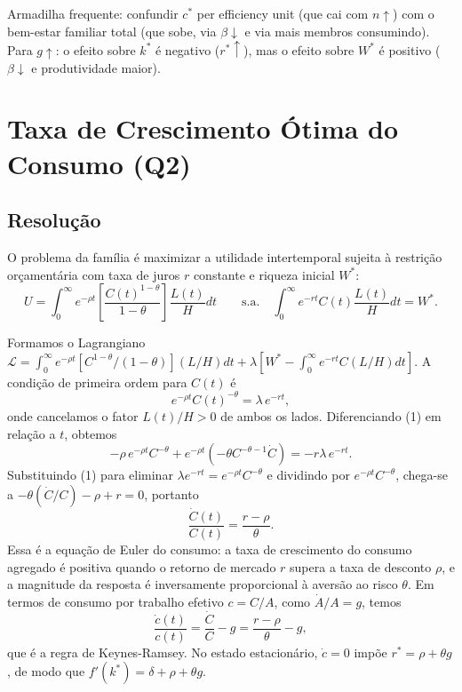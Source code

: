 \documentclass[12pt, a4paper]{article}
\begin{document}
\begin{provabox}[title={Q1 --- Atenção em (c) e (d)}]
Armadilha frequente: confundir $c^*$ per efficiency unit (que cai com $n\uparrow$) com o bem-estar familiar total (que sobe, via $\beta\downarrow$ e via mais membros consumindo). Para $g\uparrow$: o efeito sobre $k^*$ é negativo ($r^*\uparrow$), mas o efeito sobre $W^*$ é positivo ($\beta\downarrow$ e produtividade maior).
\end{provabox}

\section{Taxa de Crescimento Ótima do Consumo (Q2)}

\subsection*{Resolução}

O problema da família é maximizar a utilidade intertemporal sujeita à restrição orçamentária com taxa de juros $r$ constante e riqueza inicial $W^*$:
\[
U = \int_0^\infty e^{-\rho t}\!\left[\frac{C(t)^{1-\theta}}{1-\theta}\right]\frac{L(t)}{H}dt \qquad
\text{s.a.}\quad \int_0^\infty e^{-rt}C(t)\frac{L(t)}{H}dt = W^*.
\]

Formamos o Lagrangiano $\mathcal{L} = \int_0^\infty e^{-\rho t}[C^{1-\theta}/(1-\theta)](L/H)dt + \lambda[W^* - \int_0^\infty e^{-rt}C(L/H)dt]$. A condição de primeira ordem para $C(t)$ é
\[
e^{-\rho t}C(t)^{-\theta} = \lambda\, e^{-rt}, \tag{1}
\]
onde cancelamos o fator $L(t)/H > 0$ de ambos os lados. Diferenciando (1) em relação a $t$, obtemos
\[
-\rho\, e^{-\rho t}C^{-\theta} + e^{-\rho t}(-\theta C^{-\theta-1}\dot{C}) = -r\lambda\, e^{-rt}.
\]
Substituindo (1) para eliminar $\lambda e^{-rt} = e^{-\rho t}C^{-\theta}$ e dividindo por $e^{-\rho t}C^{-\theta}$, chega-se a $-\theta(\dot{C}/C) - \rho + r = 0$, portanto
\[
\frac{\dot{C}(t)}{C(t)} = \frac{r - \rho}{\theta}. \tag{2}
\]
Essa é a equação de Euler do consumo: a taxa de crescimento do consumo agregado é positiva quando o retorno de mercado $r$ supera a taxa de desconto $\rho$, e a magnitude da resposta é inversamente proporcional à aversão ao risco $\theta$. Em termos de consumo por trabalho efetivo $c = C/A$, como $\dot{A}/A = g$, temos
\[
\frac{\dot{c}(t)}{c(t)} = \frac{\dot{C}}{C} - g = \frac{r - \rho}{\theta} - g,
\]
que é a regra de Keynes-Ramsey. No estado estacionário, $\dot{c} = 0$ impõe $r^* = \rho + \theta g$, de modo que $f'(k^*) = \delta + \rho + \theta g$.
\end{document}
